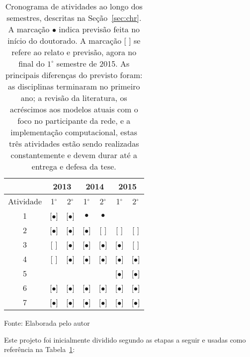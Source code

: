 \documentclass[a4paper,openright,12pt]{report} %
\newcommand{\source}[1]{\caption*{Fonte: {#1}} }
\begin{document}
\begin{table}[h]
\begin{center}
  \caption{ \footnotesize Cronograma de atividades ao longo dos semestres, descritas na Seção~\ref{sec:chr}.
      A marcação $\bullet$ indica previsão feita no início do doutorado.
  A marcação [ ] se refere ao relato e previsão, agora no final do $1^{\circ}$ semestre de 2015.
  As principais diferenças do previsto foram: as disciplinas terminaram no primeiro ano; a revisão da literatura, os acréscimos aos modelos atuais com o foco no participante da rede, e a implementação computacional, estas três atividades estão sendo realizadas constantemente e devem durar até a entrega e defesa da tese. }
\label{tab:cron}
  \begin{tabular}{ | c ||   c | c |     c | c |   c | c |}
    \hline
      & \multicolumn{2}{|c|}{2013} & \multicolumn{2}{|c|}{2014} & \multicolumn{2}{|c|}{2015} \\
    \hline
    Atividade & 1$^{\circ}$ & 2$^{\circ}$ & 1$^{\circ}$ & 2$^{\circ}$ & 1$^{\circ}$ & 2$^{\circ}$ \\
    \hline \hline

    1 & [$\bullet$] & [$\bullet$] & $\bullet$ & $\bullet$ & & \\
    \hline
    2 & [$\bullet$] & [$\bullet$] & [$\bullet$] & [ ] & [ ] & [ ] \\
    \hline
    3 & [ ] & [$\bullet$] & [$\bullet$] & [$\bullet$] & [$\bullet$] & [ ]  \\
    \hline
    4 & [ ] & [$\bullet$] & [$\bullet$] & [$\bullet$] & [$\bullet$] & [$\bullet$]  \\
    \hline
    5 & & & & & [$\bullet$] & [$\bullet$]  \\
    \hline
    6 & [$\bullet$] & [$\bullet$] & [$\bullet$] & [$\bullet$] & [$\bullet$] & [$\bullet$]  \\
    \hline
    7 & [$\bullet$] & [$\bullet$] & [$\bullet$] & [$\bullet$] & [$\bullet$] & [$\bullet$]  \\
    \hline
  \end{tabular}
\end{center}
\vspace{-.2cm}
\source{Elaborada pelo autor}
\end{table}
\vspace{-.3cm}


Este projeto foi inicialmente dividido segundo as etapas a seguir 
e usadas como referência na Tabela~\ref{tab:cron}:
\end{document}
